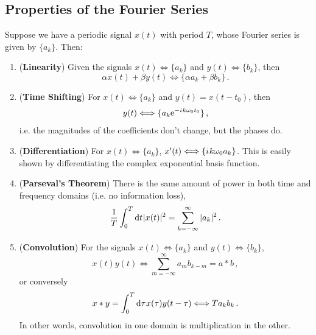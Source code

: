 \subsection{Properties of the Fourier Series}
%
Suppose we have a periodic signal $x(t)$ with period $T$, whose Fourier series is given by
$\{a_k\}$. Then:
%
\begin{enumerate}
\item (\textbf{Linearity}) Given the signals $x(t) \Longleftrightarrow \{a_k\}$ and
  $y(t) \Longleftrightarrow \{b_k\}$, then
  \begin{displaymath}
    \alpha x(t) + \beta y(t) \Longleftrightarrow \{\alpha a_k + \beta b_k\} \,.
  \end{displaymath}
\item (\textbf{Time Shifting}) For $x(t) \Longleftrightarrow \{a_k\}$ and
  $y(t) = x(t-t_0)$, then
  \begin{displaymath}
    y(t) \Longleftrightarrow \{a_k\mathrm{e}^{-{i\mkern1mu} k\omega_0t_0}\} \,,
  \end{displaymath}
  i.e. the magnitudes of the coefficients don't change, but the phases do.
\item (\textbf{Differentiation}) For $x(t) \Longleftrightarrow \{a_k\}$,
  $x^\prime(t) \Longleftrightarrow \{{i\mkern1mu} k\omega_0 a_k\}$. This is easily shown by
  differentiating the complex exponential basis function.
\item (\textbf{Parseval's Theorem}) There is the same amount of power in both time
  and frequency domains (i.e. no information loss),
  \begin{displaymath}
    \frac{1}{T}\int_0^T \mathrm{d}t\mkern1mu |x(t)|^2 = \sum_{k=-\infty}^\infty |a_k|^2 \,.
  \end{displaymath}
\item (\textbf{Convolution}) For the signals $x(t) \Longleftrightarrow \{a_k\}$ and
  $y(t) \Longleftrightarrow \{b_k\}$,
  \begin{displaymath}
    x(t)y(t) \Longleftrightarrow \sum_{m=-\infty}^\infty a_m b_{k-m} = a * b \,,
  \end{displaymath}
  or conversely
  \begin{displaymath}
    x* y = \int_0^T \mathrm{d}\tau\mkern1mu x(\tau)y(t-\tau) \Longleftrightarrow Ta_kb_k \,.
  \end{displaymath}
  In other words, convolution in one domain is multiplication in the other.
\end{enumerate}
